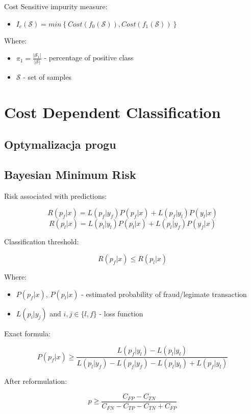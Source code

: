 \documentclass{book}
\begin{document}
	
	Cost Sensitive impurity measure:
	\begin{itemize}
		\item $I_c(\mathcal{S}) = min \left\{ Cost(f_0(\mathcal{S})), Cost(f_1(\mathcal{S})) \right\}$
	\end{itemize}{}
	
	Where:
	\begin{itemize}
		\item $\pi_1 = \frac{|\mathcal{S}_{1}|}{|\mathcal{S}|}$ - percentage of positive class
		\item $\mathcal{S}$ - set of samples
	\end{itemize}{}

\section{Cost Dependent Classification}

\subsection{Optymalizacja progu}



\subsection{Bayesian Minimum Risk}

	Risk associated with predictions:
	
	$$ R(p_f|x) = L(p_f|y_f)P(p_f|x) + L(p_f|y_l)P(y_l|x) $$
	$$ R(p_l|x) = L(p_l|y_l)P(p_l|x) + L(p_l|y_f)P(y_f|x) $$
	
	Classification threshold:
	
	$$ R(p_f|x) \leq R(p_l|x)$$
	
	Where:
	
	\begin{itemize}
		\item $P(p_f|x)$, $P(p_l|x)$ - estimated probability of fraud/legimate transaction
		\item $L(p_{i}|y_{j})$ and $i,j \in \{l,f\}$ - loss function
	\end{itemize}{}
	    Exact formula:
	
	$$ P(p_f|x) \ge \frac{L(p_f|y_l) - L(p_l|y_l)}{L(p_l|y_f) - L(p_f|y_f) - L(p_l|y_l) + L(p_f|y_l)}$$
	
	After reformulation:
	
	$$ p \ge \frac{C_{FP} - C_{TN}}{C_{FN} - C_{TP} - C_{TN} + C_{FP}}$$
\end{document}
